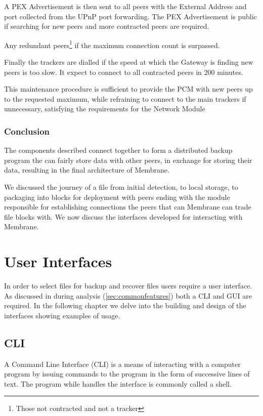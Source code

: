 \documentclass[11pt, a4paper, twoside]{report}
\begin{document}
A PEX Advertisement is then sent to all peers with the External Address and port collected from the UPnP port forwarding. The PEX Advertisement is public if searching for new peers and more contracted peers are required.

Any redundant peers\footnote{Those not contracted and not a tracker} if the maximum connection count is surpassed.

Finally the trackers are dialled if the speed at which the Gateway is finding new peers is too slow. It expect to connect to all contracted peers in 200 minutes.

This maintenance procedure is sufficient to provide the PCM with new peers up to the requested maximum, while refraining to connect to the main trackers if unnecessary, satisfying the requirements for the Network Module

\subsection{Conclusion}

The components described connect together to form a distributed backup program the can fairly store data with other peers, in exchange for storing their data, resulting in the final architecture of Membrane.

We discussed the journey of a file from initial detection, to local storage, to packaging into blocks for deployment with peers ending with the module responsible for establishing connections the peers that can Membrane can trade file blocks with. We now discuss the interfaces developed for interacting with Membrane.

\chapter{User Interfaces}

In order to select files for backup and recover files users require a user interface. As discussed in during analysis (\ref{sec:commonfeatures}) both a CLI and GUI are required. In the following chapter we delve into the building and design of the interfaces showing examples of usage.

\section{CLI}

A Command Line Interface (CLI) is a means of interacting with a computer program by issuing commands to the program in the form of successive lines of text. The program while handles the interface is commonly called a shell.
\end{document}
